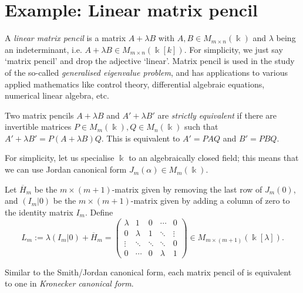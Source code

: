 \documentclass[11pt,a4paper]{article}
\numberwithin{equation}{section}
\theoremstyle{all}
\theoremstyle{remark}
\newcommand{\defn}[1]{\textsl{\color{darkblue} #1}}
\begin{document}
\pagebreak

\section{Example: Linear matrix pencil}

A \defn{linear matrix pencil} is a matrix $A+\lambda B$ with $A,B\in M_{m\times n}(\Bbbk)$ and $\lambda$ being an indeterminant, i.e. $A+\lambda B \in M_{m\times n}(\Bbbk[k])$.  For simplicity, we just say `matrix pencil' and drop the adjective `linear'.
Matrix pencil is used in the study of the so-called \emph{generalised eigenvalue problem}, and has applications to various applied mathematics like control theory, differential algebraic equations, numerical linear algebra, etc.


Two matrix pencils $A+\lambda B$ and $A'+\lambda B'$ are \defn{strictly equivalent} if there are invertible matrices $P\in M_m(\Bbbk),Q\in M_n(\Bbbk)$ such that $A'+\lambda B' = P(A+\lambda B) Q$.  This is equivalent to $A'=PAQ$ and $B'=PBQ$.

For simplicity, let us specialise $\Bbbk$ to an algebraically closed field; this means that we can use Jordan canonical form $J_m(\alpha) \in M_m(\Bbbk)$.


Let $\overline{H}_{m}$ be the $m\times (m+1)$-matrix given by removing the last row of $J_m(0)$, and $(I_m|0)$ be the $m\times (m+1)$-matrix given by adding a column of zero to the identity matrix $I_m$.
Define
\[
L_m := \lambda (I_m|0) + \overline{H}_m = \begin{pmatrix}
\lambda & 1& 0 & \cdots & 0 \\
0 &\lambda & 1 & \ddots & \vdots \\
\vdots & \ddots & \ddots & \ddots & 0 \\
0 & \cdots & 0 & \lambda & 1
\end{pmatrix} \in M_{m\times (m+1)}(\Bbbk [\lambda]).
\]

Similar to the Smith/Jordan canonical form, each matrix pencil of  is equivalent to one in \defn{Kronecker canonical form}.  
\end{document}
